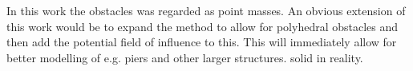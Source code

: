 \documentclass[a4paper,conference]{IEEEtran}
\begin{document}
In this work the obstacles was regarded as point masses. An obvious extension of this work would be to expand the method to allow for polyhedral obstacles and then add the potential field of influence to this. This will immediately allow for better modelling of e.g. piers and other larger structures. 
solid in reality. 


 

\end{document}
